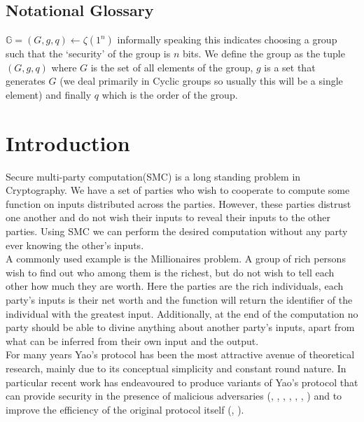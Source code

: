 \documentclass[ %
                    author={Nicholas Tutte},
                supervisor={Prof. Nigel Smart},
                    degree={MEng},
                     title={Secure Two Party Computation},
                  subtitle={A practical comparison of recent protocols},
                      type={Research - GG1K},
                      year={2015} ]{dissertation}
\begin{document}
		\section*{Notational Glossary}
			$\mathbb{G} = (G, g, q) \leftarrow \zeta(1^n)$ informally speaking this indicates choosing a group such that the `security' of the group is $n$ bits. We define the group as the tuple $(G, g, q)$ where $G$ is the set of all elements of the group, $g$ is a set that generates $G$ (we deal primarily in Cyclic groups so usually this will be a single element) and finally $q$ which is the order of the group.

	\tableofcontents


	
	\chapter{Introduction}
		Secure multi-party computation(SMC) is a long standing problem in Cryptography. We have a set of parties who wish to cooperate to compute some function on inputs distributed across the parties. However, these parties distrust one another and do not wish their inputs to reveal their inputs to the other parties. Using SMC we can perform the desired computation without any party ever knowing the other's inputs.\\

		A commonly used example is the Millionaires problem. A group of rich persons wish to find out who among them is the richest, but do not wish to tell each other how much they are worth. Here the parties are the rich individuals, each party's inputs is their net worth and the function will return the identifier of the individual with the greatest input. Additionally, at the end of the computation no party should be able to divine anything about another party's inputs, apart from what can be inferred from their own input and the output.\\

		For many years Yao's protocol \cite{YaoOriginal} has been the most attractive avenue of theoretical research, mainly due to its conceptual simplicity and constant round nature. In particular recent work has endeavoured to produce variants of Yao's protocol that can provide security in the presence of malicious adversaries (\cite{LindellAndPinkas2007}, \cite{LindellAndPinkas2011}, \cite{Lindell_CnC_2013}, \cite{Katz_Symm_CnC_2013}, \cite{OnCommittedInputs}, \cite{LEGO_Paper}, \cite{MiniLEGO}) and to improve the efficiency of the original protocol itself (\cite{SMC_Is_Practical}, \cite{FreeXOR}).\\
\end{document}
